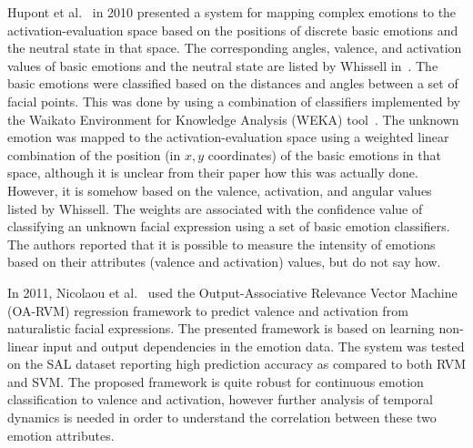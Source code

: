 \documentclass[10pt,journal,cspaper,compsoc]{IEEEtran}
\begin{document}
Hupont et al.~\cite{Hupont10} in 2010 presented a system for mapping complex emotions to the activation-evaluation space based on the positions of discrete basic emotions and the neutral state in that space. The corresponding angles, valence, and activation values of basic emotions and the neutral state are listed by Whissell in~\cite{Whissell89}. The basic emotions were classified based on the distances and angles between a set of facial points. This was done by using a combination of classifiers implemented by the Waikato Environment for Knowledge Analysis (WEKA) tool~\cite{hall2009weka}. The unknown emotion was mapped to the activation-evaluation space using a weighted linear combination of the position (in $x, y$ coordinates) of the basic emotions in that space, although it is unclear from their paper how this was actually done. However, it is somehow based on the valence, activation, and angular values listed by Whissell. The weights are associated with the confidence value of classifying an unknown facial expression using a set of basic emotion classifiers. The authors reported that it is possible to measure the intensity of emotions based on their attributes (valence and activation) values, but do not say how.

In 2011, Nicolaou et al.~\cite{nicolaou2011output} used the Output-Associative Relevance Vector Machine (OA-RVM) regression framework to predict valence and activation from naturalistic facial expressions. The presented framework is based on learning non-linear input and output dependencies in the emotion data. The system was tested on the SAL dataset reporting high prediction accuracy as compared to both RVM and SVM. The proposed framework is quite robust for continuous emotion classification to valence and activation, however further analysis of temporal dynamics is needed in order to understand the correlation between these two emotion attributes.
\end{document}

